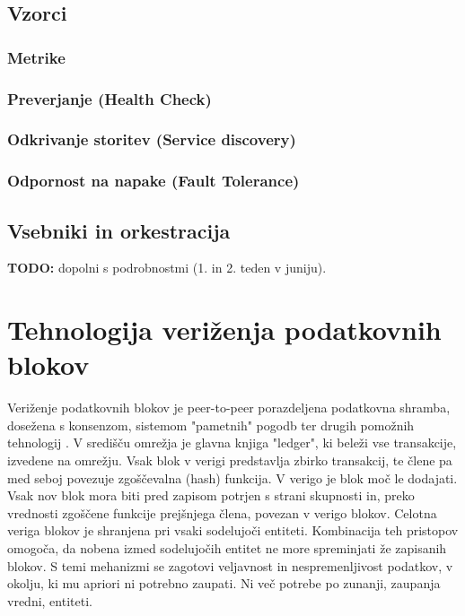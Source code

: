 \documentclass[a4paper, 12pt]{book}
\begin{document}
\section{Vzorci}

\subsection{Metrike}
\subsection{Preverjanje (Health Check)}
\subsection{Odkrivanje storitev (Service discovery)}
\subsection{Odpornost na napake (Fault Tolerance)}

\section{Vsebniki in orkestracija}

\textbf{TODO:} dopolni s podrobnostmi (1. in 2. teden v juniju).


\chapter{Tehnologija veriženja podatkovnih blokov}
\label{ch2}

Veriženje podatkovnih blokov je peer-to-peer porazdeljena podatkovna shramba, dosežena s konsenzom, sistemom "pametnih" pogodb ter drugih pomožnih tehnologij \cite{hyperledgerWeb}. V središču omrežja je glavna knjiga "ledger", ki beleži vse transakcije, izvedene na omrežju. \cite{hyperledgerDocs}
Vsak blok v verigi predstavlja zbirko transakcij, te člene pa med seboj povezuje zgoščevalna (hash) funkcija.
V verigo je blok moč le dodajati.
Vsak nov blok mora biti pred zapisom potrjen s strani skupnosti in, preko vrednosti zgoščene funkcije prejšnjega člena, povezan v verigo blokov.
Celotna veriga blokov je shranjena pri vsaki sodelujoči entiteti.
Kombinacija teh pristopov omogoča, da nobena izmed sodelujočih entitet ne more spreminjati že zapisanih blokov.
S temi mehanizmi se zagotovi veljavnost in nespremenljivost podatkov, v okolju, ki mu apriori ni potrebno zaupati.
Ni več potrebe po zunanji, zaupanja vredni, entiteti.
\end{document}
